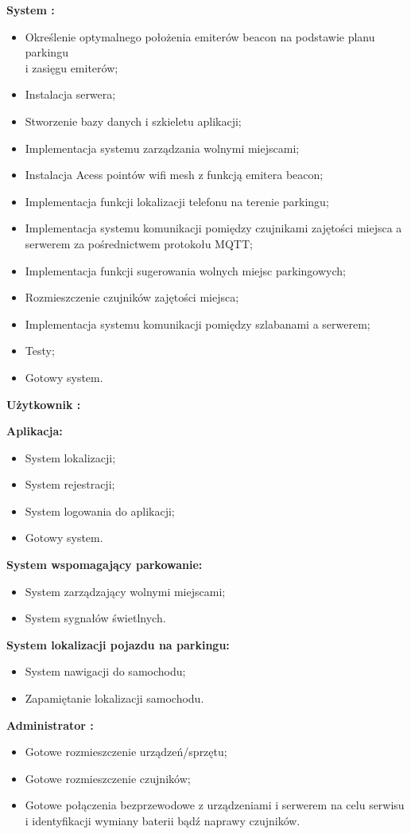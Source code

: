 \documentclass[12pt,a4paper]{article}
\begin{document}
{\large \bf System :}
\begin{itemize}
\item Określenie optymalnego położenia emiterów beacon na podstawie planu parkingu \\i zasięgu emiterów;
\item Instalacja serwera;
\item Stworzenie bazy danych i szkieletu aplikacji;
\item Implementacja systemu zarządzania wolnymi  miejscami;
\item Instalacja Acess pointów wifi mesh z funkcją emitera beacon;
\item Implementacja funkcji lokalizacji telefonu na terenie parkingu;
\item Implementacja systemu komunikacji pomiędzy czujnikami zajętości miejsca a serwerem za pośrednictwem protokołu MQTT;
\item Implementacja funkcji sugerowania wolnych miejsc parkingowych;
\item Rozmieszczenie czujników zajętości miejsca;
\item Implementacja systemu komunikacji pomiędzy szlabanami a serwerem;
\item Testy;
\item Gotowy system.
\end{itemize}
{\large \bf Użytkownik :}

{\bf Aplikacja:}
\begin{itemize}
\item System lokalizacji;
\item System rejestracji;
\item System logowania do aplikacji;
\item Gotowy system.
\end{itemize}



\newpage

{\bf System wspomagający parkowanie:}
\begin{itemize}
\item System zarządzający wolnymi miejscami;
\item System sygnałów świetlnych.
\end{itemize}

{\bf System lokalizacji pojazdu na parkingu:}
\begin{itemize}
\item System nawigacji do samochodu;
\item Zapamiętanie lokalizacji samochodu.
\end{itemize}
{\large \bf Administrator :}
\begin{itemize}
\item Gotowe rozmieszczenie urządzeń/sprzętu;
\item Gotowe rozmieszczenie czujników;
\item Gotowe połączenia bezprzewodowe z urządzeniami i serwerem na celu serwisu i identyfikacji wymiany baterii bądź naprawy czujników.
\end{itemize}
\end{document}
